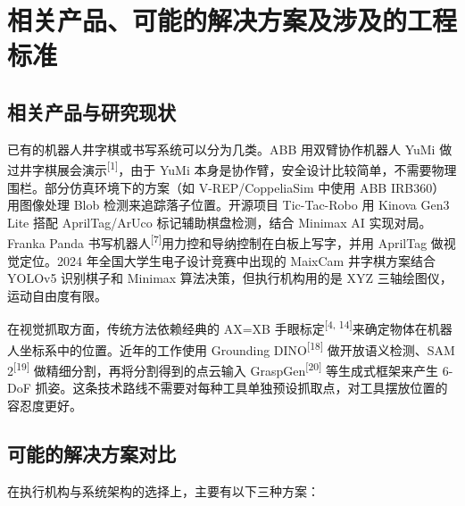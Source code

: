 \documentclass[a4paper, 12pt, oneside]{ctexart}
\newcommand{\supercite}[1]{\textsuperscript{[#1]}}
\begin{document}
\section{相关产品、可能的解决方案及涉及的工程标准}

\subsection{相关产品与研究现状}

已有的机器人井字棋或书写系统可以分为几类。ABB 用双臂协作机器人 YuMi 做过井字棋展会演示\supercite{1}，由于 YuMi 本身是协作臂，安全设计比较简单，不需要物理围栏。部分仿真环境下的方案（如 V-REP/CoppeliaSim 中使用 ABB IRB360）用图像处理 Blob 检测来追踪落子位置。开源项目 Tic-Tac-Robo 用 Kinova Gen3 Lite 搭配 AprilTag/ArUco 标记辅助棋盘检测，结合 Minimax AI 实现对局。Franka Panda 书写机器人\supercite{7}用力控和导纳控制在白板上写字，并用 AprilTag 做视觉定位。2024 年全国大学生电子设计竞赛中出现的 MaixCam 井字棋方案结合 YOLOv5 识别棋子和 Minimax 算法决策，但执行机构用的是 XYZ 三轴绘图仪，运动自由度有限。

在视觉抓取方面，传统方法依赖经典的 AX=XB 手眼标定\supercite{4, 14}来确定物体在机器人坐标系中的位置。近年的工作使用 Grounding DINO\supercite{18} 做开放语义检测、SAM 2\supercite{19} 做精细分割，再将分割得到的点云输入 GraspGen\supercite{20} 等生成式框架来产生 6-DoF 抓姿。这条技术路线不需要对每种工具单独预设抓取点，对工具摆放位置的容忍度更好。

\subsection{可能的解决方案对比}

在执行机构与系统架构的选择上，主要有以下三种方案：
\end{document}
